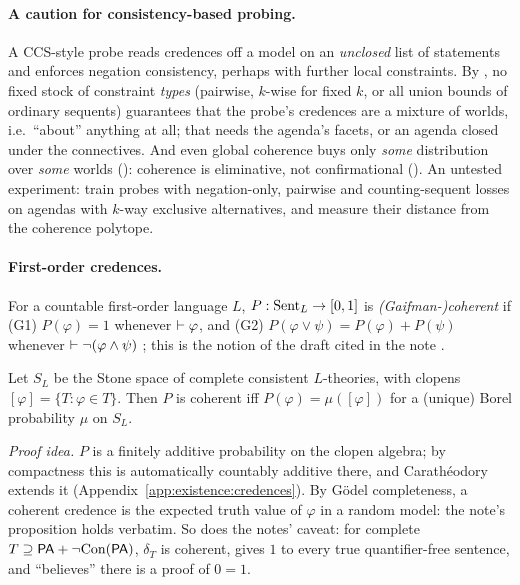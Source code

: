 \paragraph{A caution for consistency-based probing.} A CCS-style probe reads credences off a model on an \emph{unclosed} list of statements and enforces negation consistency, perhaps with further local constraints. By , no fixed stock of constraint \emph{types} (pairwise, $k$-wise for fixed $k$, or all union bounds of ordinary sequents) guarantees that the probe's credences are a mixture of worlds, i.e.\ ``about'' anything at all; that needs the agenda's facets, or an agenda closed under the connectives. And even global coherence buys only \emph{some} distribution over \emph{some} worlds (): coherence is eliminative, not confirmational (). An untested experiment: train probes with negation-only, pairwise and counting-sequent losses on agendas with $k$-way exclusive alternatives, and measure their distance from the coherence polytope.

\paragraph{First-order credences.} For a countable first-order language $L$, $P:\mathrm{Sent}_L\to[0,1]$ is \emph{(Gaifman-)coherent} if (G1) $P(\varphi)=1$ whenever $\vdash\varphi$, and (G2) $P(\varphi\vee\psi)=P(\varphi)+P(\psi)$ whenever $\vdash\neg(\varphi\wedge\psi)$ \citep{gaifman1964concerning}; this is the notion of the draft cited in the note \citep{christiano2013definability}.

\begin{theorem}\label{thm:existence:gaifman}
Let $S_L$ be the Stone space of complete consistent $L$-theories, with clopens $[\varphi]=\{T:\varphi\in T\}$. Then $P$ is coherent iff $P(\varphi)=\mu([\varphi])$ for a (unique) Borel probability $\mu$ on $S_L$.
\end{theorem}

\emph{Proof idea.} $P$ is a finitely additive probability on the clopen algebra; by compactness this is automatically countably additive there, and Carath\'eodory extends it (Appendix~\ref{app:existence:credences}). By G\"odel completeness, a coherent credence is the expected truth value of $\varphi$ in a random model: the note's proposition holds verbatim. So does the notes' caveat: for complete $T\supseteq\mathsf{PA}+\neg\mathrm{Con}(\mathsf{PA})$, $\delta_T$ is coherent, gives $1$ to every true quantifier-free sentence, and ``believes'' there is a proof of $0=1$.

